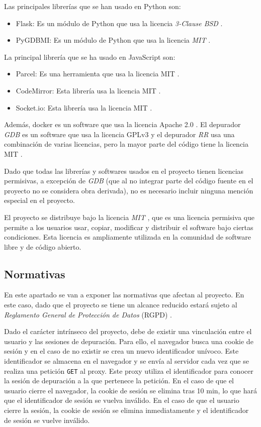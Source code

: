 Las principales librerías que se han usado en Python son:
\begin{itemize}
    \item Flask: Es un módulo de Python que usa la licencia \textit{3-Clause BSD} \cite{flask}.
    \item PyGDBMI: Es un módulo de Python que usa la licencia \textit{MIT} \cite{pygdbmi}.
\end{itemize}

La principal librería que se ha usado en JavaScript son:
\begin{itemize}
    \item Parcel: Es una herramienta que usa la licencia MIT \cite{parcel}.
    \item CodeMirror: Esta librería usa la licencia MIT \cite{codemirror}. 
    \item Socket.io: Esta librería usa la licencia MIT \cite{socket.io}.
\end{itemize}

Además, docker es un software que usa la licencia Apache 2.0 \cite{docker}. El depurador \textit{GDB} es un software que usa la licencia GPLv3 \cite{GDB} y el depurador \textit{RR} usa una combinación de varias licencias, pero la mayor parte del código tiene la licencia MIT \cite{RR-Github}.

Dado que todas las librerías y softwares usados en el proyecto tienen licencias permisivas, a excepción de \textit{GDB} (que al no integrar parte del código fuente en el proyecto no se considera obra derivada), no es necesario incluir ninguna mención especial en el proyecto.

El proyecto se distribuye bajo la licencia \textit{MIT} \cite{mit}, que es una licencia permisiva que permite a los usuarios usar, copiar, modificar y distribuir el software bajo ciertas condiciones. Esta licencia es ampliamente utilizada en la comunidad de software libre y de código abierto.

\subsection{Normativas}\label{subsec:normativas}

En este apartado se van a exponer las normativas que afectan al proyecto. En este caso, dado que el proyecto se tiene un alcance reducido estará sujeto al \textit{Reglamento General de Protección de Datos} (RGPD) \cite{rgpd}.

Dado el carácter intrínseco del proyecto, debe de existir una vinculación entre el usuario y las sesiones de depuración. Para ello, el navegador busca una cookie de sesión y en el caso de no existir se crea un nuevo identificador unívoco. Este identificador se almacena en el navegador y se envía al servidor cada vez que se realiza una petición \texttt{GET} al proxy. Este proxy utiliza el identificador para conocer la sesión de depuración a la que pertenece la petición. En el caso de que el usuario cierre el navegador, la cookie de sesión se elimina tras 10 min, lo que hará que el identificador de sesión se vuelva inválido. En el caso de que el usuario cierre la sesión, la cookie de sesión se elimina inmediatamente y el identificador de sesión se vuelve inválido.

